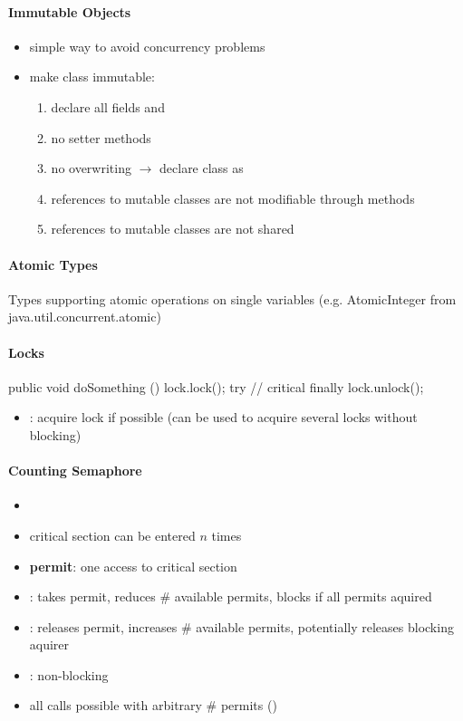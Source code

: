 \paragraph{Immutable Objects}
\begin{itemize}
  \item simple way to avoid concurrency problems
  \item make class immutable:
  \begin{enumerate}
    \item declare all fields  and 
    \item no setter methods
    \item no overwriting \( \to \) declare class as 
    \item references to mutable classes are not modifiable through methods
    \item references to mutable classes are not shared
  \end{enumerate}
\end{itemize}

\paragraph{Atomic Types}

Types supporting atomic operations on single variables (e.g. AtomicInteger from java.util.concurrent.atomic)

\paragraph{Locks}
\begin{java}
  public void doSomething () {
    lock.lock();
    try {
      // critical
    } finally {
      lock.unlock();
    }
  }
\end{java}
\begin{itemize}
  \item {}: acquire lock if possible (can be used to acquire several locks without blocking)
\end{itemize}

\paragraph{Counting Semaphore}
\begin{itemize}
  \item {}
  \item critical section can be entered \( n \) times
  \item \textbf{permit}: one access to critical section
  \item {}: takes permit, reduces \# available permits, blocks if all permits aquired
  \item {}: releases permit, increases \# available permits, potentially releases blocking aquirer
  \item {}: non-blocking 
  \item all calls possible with arbitrary \# permits ()
\end{itemize}

